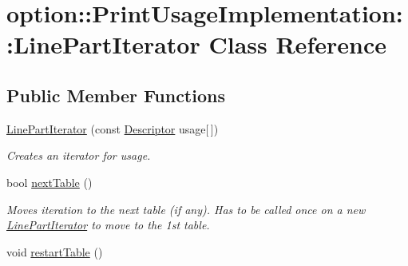 \hypertarget{classoption_1_1PrintUsageImplementation_1_1LinePartIterator}{}\section{option\+:\+:Print\+Usage\+Implementation\+:\+:Line\+Part\+Iterator Class Reference}
\label{classoption_1_1PrintUsageImplementation_1_1LinePartIterator}
\subsection*{Public Member Functions}
\begin{DoxyCompactItemize}
\item 
\hyperlink{classoption_1_1PrintUsageImplementation_1_1LinePartIterator_a8a61fef9ba907fd4e10ff0fd772ee5e7}{Line\+Part\+Iterator} (const \hyperlink{structoption_1_1Descriptor}{Descriptor} usage\mbox{[}$\,$\mbox{]})\hypertarget{classoption_1_1PrintUsageImplementation_1_1LinePartIterator_a8a61fef9ba907fd4e10ff0fd772ee5e7}{}\label{classoption_1_1PrintUsageImplementation_1_1LinePartIterator_a8a61fef9ba907fd4e10ff0fd772ee5e7}

\begin{DoxyCompactList}\small\item\em Creates an iterator for {\ttfamily usage}. \end{DoxyCompactList}\item 
bool \hyperlink{classoption_1_1PrintUsageImplementation_1_1LinePartIterator_afe43ca12d399ed3c871e4dc5bf63356e}{next\+Table} ()
\begin{DoxyCompactList}\small\item\em Moves iteration to the next table (if any). Has to be called once on a new \hyperlink{classoption_1_1PrintUsageImplementation_1_1LinePartIterator}{Line\+Part\+Iterator} to move to the 1st table. \end{DoxyCompactList}\item 
void \hyperlink{classoption_1_1PrintUsageImplementation_1_1LinePartIterator_a0cbe8ed79ab4958a70b957598dd76fa6}{restart\+Table} ()\hypertarget{classoption_1_1PrintUsageImplementation_1_1LinePartIterator_a0cbe8ed79ab4958a70b957598dd76fa6}{}\label{classoption_1_1PrintUsageImplementation_1_1LinePartIterator_a0cbe8ed79ab4958a70b957598dd76fa6}


\end{DoxyCompactItemize}
